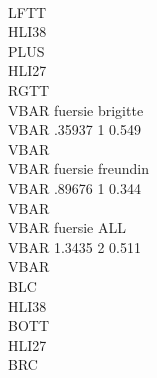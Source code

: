   {\lbr}\\LFTT{\rbr}\\HLI{\lbr}38{\rbr}{\lbr}\\PLUS{\rbr}\\HLI{\lbr}27{\rbr}{\lbr}\\RGTT{\rbr}
  {\lbr}\\VBAR{\rbr}           fuersie           brigitte {\lbr}\\VBAR{\rbr}  .35937     1    0.549    {\lbr}\\VBAR{\rbr}
  {\lbr}\\VBAR{\rbr}           fuersie           freundin {\lbr}\\VBAR{\rbr}  .89676     1    0.344    {\lbr}\\VBAR{\rbr}
  {\lbr}\\VBAR{\rbr}           fuersie                ALL {\lbr}\\VBAR{\rbr}  1.3435     2    0.511    {\lbr}\\VBAR{\rbr}
  {\lbr}\\BLC{\rbr}\\HLI{\lbr}38{\rbr}{\lbr}\\BOTT{\rbr}\\HLI{\lbr}27{\rbr}{\lbr}\\BRC{\rbr}

